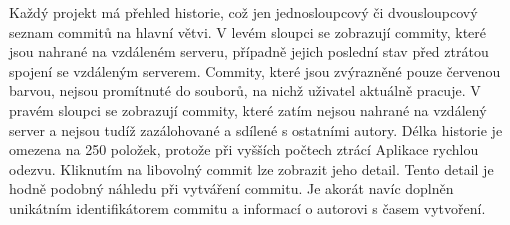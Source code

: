 Každý projekt má přehled historie, což jen jednosloupcový či dvousloupcový seznam commitů na hlavní větvi. V levém sloupci se zobrazují commity, které jsou nahrané na vzdáleném serveru, případně jejich poslední stav před ztrátou spojení se vzdáleným serverem. Commity, které jsou zvýrazněné pouze červenou barvou, nejsou promítnuté do souborů, na nichž uživatel aktuálně pracuje. V pravém sloupci se zobrazují commity, které zatím nejsou nahrané na vzdálený server a nejsou tudíž zazálohované a sdílené s ostatními autory. Délka historie je omezena na 250 položek, protože při vyšších počtech ztrácí Aplikace rychlou odezvu. Kliknutím na libovolný commit lze zobrazit jeho detail. Tento detail je hodně podobný náhledu při vytváření commitu. Je akorát navíc doplněn unikátním identifikátorem commitu a informací o autorovi s časem vytvoření.

